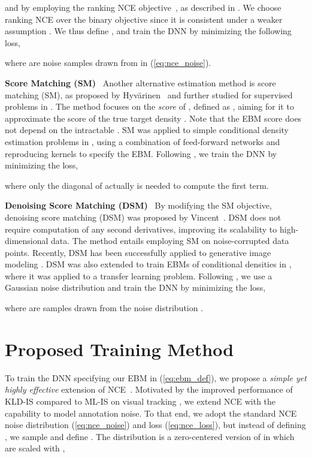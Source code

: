 \documentclass{bmvc2k}
\newcommand{\parsection}[1]{\vspace{2mm}\noindent\textbf{#1}~ }
\begin{document}
and by employing the ranking NCE objective~\cite{jozefowicz2016exploring}, as described in \cite{ma2018noise}. We choose ranking NCE over the binary objective since it is consistent under a weaker assumption \cite{ma2018noise}. We thus define , and train the DNN  by minimizing the following loss,

where  are  noise samples drawn from  in (\ref{eq:nce_noise}).







\parsection{Score Matching (SM)}
Another alternative estimation method is score matching (SM), as proposed by Hyv{\"a}rinen~\cite{hyvarinen2005estimation} and further studied for supervised problems in \cite{sasaki2018neural}. The method focuses on the \emph{score} of , defined as , aiming for it to approximate the score of the true target density . Note that the EBM score  does not depend on the intractable . SM was applied to simple conditional density estimation problems in \cite{sasaki2018neural}, using a combination of feed-forward networks and reproducing kernels to specify the EBM. Following \cite{sasaki2018neural}, we train the DNN  by minimizing the loss, 

where only the diagonal of  actually is needed to compute the first term.











\parsection{Denoising Score Matching (DSM)}
By modifying the SM objective, denoising score matching (DSM) was proposed by Vincent~\cite{vincent2011connection}. DSM does not require computation of any second derivatives, improving its scalability to high-dimensional data. The method entails employing SM on noise-corrupted data points. Recently, DSM has been successfully applied to generative image modeling \cite{saremi2018deep, song2019generative, li2019annealed}. DSM was also extended to train EBMs of conditional densities in \cite{khemakhem2020ice}, where it was applied to a transfer learning problem. Following \cite{khemakhem2020ice}, we use a Gaussian noise distribution and train the DNN  by minimizing the loss,

where  are  samples drawn from the noise distribution . \section{Proposed Training Method}
\label{section:method}
To train the DNN  specifying our EBM  in (\ref{eq:ebm_def}), we propose a \emph{simple yet highly effective} extension of NCE~\cite{gutmann2010noise}. Motivated by the improved performance of KLD-IS compared to ML-IS on visual tracking \cite{danelljan2020probabilistic}, we extend NCE with the capability to model annotation noise. To that end, we adopt the standard NCE noise distribution  (\ref{eq:nce_noise}) and loss (\ref{eq:nce_loss}), but instead of defining , we sample  and define . The distribution  is a zero-centered version of  in which  are scaled with ,
\end{document}
